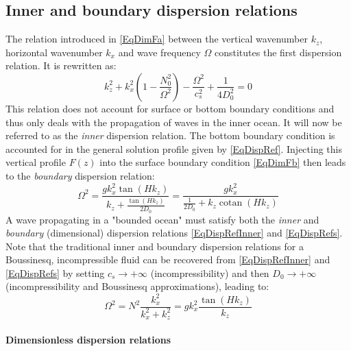 \documentclass[a4paper,11pt]{article}
\DeclareMathOperator{\cotan}{cotan}
\begin{document}
\subsection{Inner and boundary dispersion relations}
The relation introduced in \ref{EqDimFa} between the vertical wavenumber $k_z$, horizontal wavenumber $k_x$ and wave frequency $\Omega$ constitutes the first dispersion relation. It is rewritten as:
\begin{equation}
  \label{EqDispRefInner}
  \displaystyle
  k_z^2+
   k_x^2\left(1-\frac{N_0^2}{\Omega^2}\right)
   -\frac{\Omega^2}{c_s^2}+\frac{1}{4D_0^2}=0
\end{equation}
%
This relation does not account for surface or bottom boundary conditions and thus only deals with the propagation of waves in the inner ocean. It will now be referred to as the \textit{inner} dispersion relation. The bottom boundary condition is accounted for in the general solution profile given by \ref{EqDispRef}.
Injecting this vertical profile $F(z)$ into the surface boundary condition \ref{EqDimFb} then leads to the \textit{boundary} dispersion relation:
%
\begin{equation}
	\label{EqDispRefs}
     \Omega^2 =\frac{gk_x^2 \tan(Hk_z)}{k_z +\frac{ \tan(Hk_z)}{2 D_0 }}
    =\frac{gk_x^2 }{\frac{1}{ 2 D_0} + k_z \cotan(Hk_z)}
\end{equation}
%
A wave propagating in a "bounded ocean" must satisfy both the \textit{inner} and \textit{boundary} (dimensional) dispersion relations \ref{EqDispRefInner} and \ref{EqDispRefs}. Note that the traditional inner and boundary dispersion relations for a Boussinesq, incompressible fluid \citep{gill_1982} can be recovered from \ref{EqDispRefInner} and \ref{EqDispRefs} by setting $c_s \rightarrow +\infty$ (incompressibility) and then $D_0 \rightarrow +\infty$ (incompressibility and Boussinesq approximations), leading to:
\[
\Omega^2=N^2\frac{k_x^2}{k_x^2+k_z^2}=gk_x^2\frac{\tan(Hk_z)}{k_z}
\]
\paragraph{Dimensionless dispersion relations}
\end{document}
